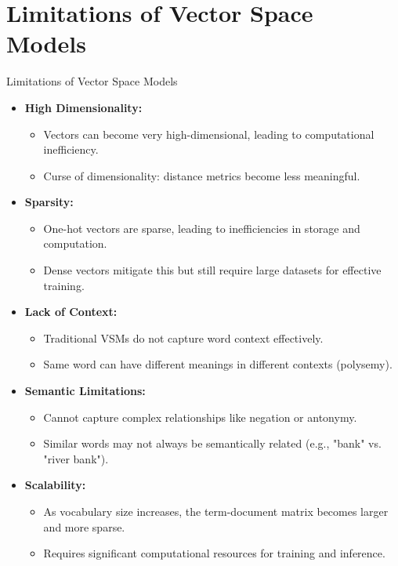 \section{Limitations of Vector Space Models}
\begin{frame}[allowframebreaks]{Limitations of Vector Space Models}
    \begin{itemize}
        \item \textbf{High Dimensionality:}
        \begin{itemize}
            \item Vectors can become very high-dimensional, leading to computational inefficiency.
            \item Curse of dimensionality: distance metrics become less meaningful.
        \end{itemize}
        \item \textbf{Sparsity:}
        \begin{itemize}
            \item One-hot vectors are sparse, leading to inefficiencies in storage and computation.
            \item Dense vectors mitigate this but still require large datasets for effective training.
        \end{itemize}
        \item \textbf{Lack of Context:}
        \begin{itemize}
            \item Traditional VSMs do not capture word context effectively.
            \item Same word can have different meanings in different contexts (polysemy).
        \end{itemize}
\framebreak
        \item \textbf{Semantic Limitations:}
        \begin{itemize}
            \item Cannot capture complex relationships like negation or antonymy.
            \item Similar words may not always be semantically related (e.g., "bank" vs. "river bank").
        \end{itemize}
        \item \textbf{Scalability:}
        \begin{itemize}
            \item As vocabulary size increases, the term-document matrix becomes larger and more sparse.
            \item Requires significant computational resources for training and inference.
        \end{itemize}
    \end{itemize}
\end{frame}